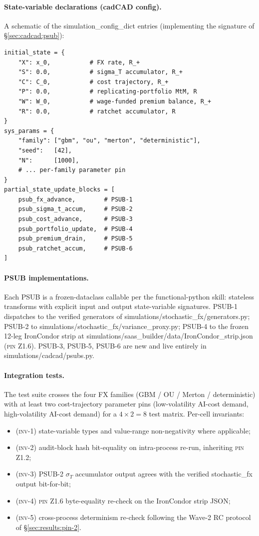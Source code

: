 \documentclass[11pt,letterpaper]{article}
\newcommand{\sigmaT}{\sigma_{T}}
\newcommand{\PinZ}[1]{\textsc{pin Z1.#1}}
\begin{document}
\paragraph{State-variable declarations (cadCAD config).}
A schematic of the simulation\_config\_dict entries
(implementing the signature of \S\ref{sec:cadcad:psub}):
\begin{verbatim}
initial_state = {
    "X": x_0,           # FX rate, R_+
    "S": 0.0,           # sigma_T accumulator, R_+
    "C": C_0,           # cost trajectory, R_+
    "P": 0.0,           # replicating-portfolio MtM, R
    "W": W_0,           # wage-funded premium balance, R_+
    "R": 0.0,           # ratchet accumulator, R
}
sys_params = {
    "family": ["gbm", "ou", "merton", "deterministic"],
    "seed":   [42],
    "N":      [1000],
    # ... per-family parameter pin
}
partial_state_update_blocks = [
    psub_fx_advance,        # PSUB-1
    psub_sigma_t_accum,     # PSUB-2
    psub_cost_advance,      # PSUB-3
    psub_portfolio_update,  # PSUB-4
    psub_premium_drain,     # PSUB-5
    psub_ratchet_accum,     # PSUB-6
]
\end{verbatim}

\paragraph{PSUB implementations.}
Each PSUB is a frozen-dataclass callable per the
functional-python skill: stateless transforms with explicit input and
output state-variable signatures. PSUB-1 dispatches to the verified
generators of \textsf{simulations/stochastic\_fx/generators.py}; PSUB-2
to \textsf{simulations/stochastic\_fx/variance\_proxy.py}; PSUB-4 to
the frozen 12-leg IronCondor strip at
\textsf{simulations/saas\_builder/data/IronCondor\_strip.json}
(\PinZ{6}). PSUB-3, PSUB-5, PSUB-6 are new and live entirely in
\textsf{simulations/cadcad/psubs.py}.

\paragraph{Integration tests.}
The test suite crosses the four FX families
(GBM / OU / Merton / deterministic) with at least two cost-trajectory
parameter pins (low-volatility AI-cost demand, high-volatility AI-cost
demand) for a $4 \times 2 = 8$ test matrix. Per-cell invariants:
\begin{itemize}
    \item \textsc{(inv-1)} state-variable types and value-range
        non-negativity where applicable;
    \item \textsc{(inv-2)} audit-block hash bit-equality on intra-process
        re-run, inheriting \PinZ{2};
    \item \textsc{(inv-3)} PSUB-2 $\sigmaT$ accumulator output agrees
        with the verified stochastic\_fx output bit-for-bit;
    \item \textsc{(inv-4)} \PinZ{6} byte-equality re-check on the
        IronCondor strip JSON;
    \item \textsc{(inv-5)} cross-process determinism re-check
        following the Wave-2 RC protocol of \S\ref{sec:results:pin-2}.
\end{itemize}
\end{document}
